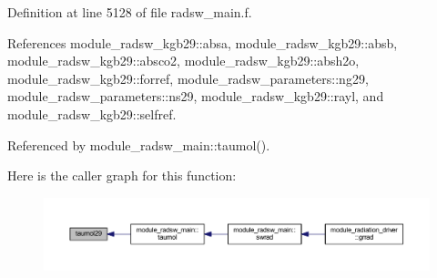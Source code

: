 Definition at line 5128 of file radsw\+\_\+main.\+f.



References module\+\_\+radsw\+\_\+kgb29\+::absa, module\+\_\+radsw\+\_\+kgb29\+::absb, module\+\_\+radsw\+\_\+kgb29\+::absco2, module\+\_\+radsw\+\_\+kgb29\+::absh2o, module\+\_\+radsw\+\_\+kgb29\+::forref, module\+\_\+radsw\+\_\+parameters\+::ng29, module\+\_\+radsw\+\_\+parameters\+::ns29, module\+\_\+radsw\+\_\+kgb29\+::rayl, and module\+\_\+radsw\+\_\+kgb29\+::selfref.



Referenced by module\+\_\+radsw\+\_\+main\+::taumol().



Here is the caller graph for this function\+:
\nopagebreak
\begin{figure}[H]
\begin{center}
\leavevmode
\includegraphics[width=350pt]{radsw__main_8f_a08e2db10432d07392f29a49bc5b5c640_icgraph}
\end{center}
\end{figure}


